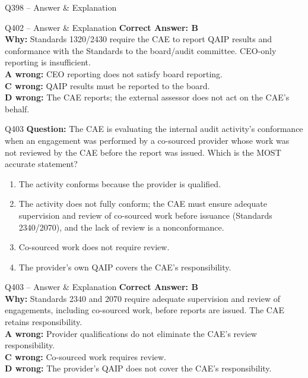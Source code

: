 \documentclass[aspectratio=169,10pt]{beamer}
\begin{document}
\begin{frame}[t]{Q398 -- Answer \& Explanation}
	\begin{frame}[t]{Q402 -- Answer \& Explanation}
		\small
		\textbf{Correct Answer: B} \\[4pt]
		\textbf{Why:} Standards 1320/2430 require the CAE to report QAIP results and conformance with the Standards to the board/audit committee. CEO-only reporting is insufficient. \\[4pt]
		\textbf{A wrong:} CEO reporting does not satisfy board reporting. \\[2pt]
		\textbf{C wrong:} QAIP results must be reported to the board. \\[2pt]
		\textbf{D wrong:} The CAE reports; the external assessor does not act on the CAE's behalf.
	\end{frame}
	
	\begin{frame}[t]{Q403}
		\small
		\textbf{Question:} The CAE is evaluating the internal audit activity's conformance when an engagement was performed by a co-sourced provider whose work was not reviewed by the CAE before the report was issued. Which is the MOST accurate statement?
		\begin{enumerate}[label=\Alph*.,itemsep=1pt,topsep=2pt]
			\item The activity conforms because the provider is qualified.
			\item The activity does not fully conform; the CAE must ensure adequate supervision and review of co-sourced work before issuance (Standards 2340/2070), and the lack of review is a nonconformance.
			\item Co-sourced work does not require review.
			\item The provider's own QAIP covers the CAE's responsibility.
		\end{enumerate}
	\end{frame}
	
	\begin{frame}[t]{Q403 -- Answer \& Explanation}
		\small
		\textbf{Correct Answer: B} \\[4pt]
		\textbf{Why:} Standards 2340 and 2070 require adequate supervision and review of engagements, including co-sourced work, before reports are issued. The CAE retains responsibility. \\[4pt]
		\textbf{A wrong:} Provider qualifications do not eliminate the CAE's review responsibility. \\[2pt]
		\textbf{C wrong:} Co-sourced work requires review. \\[2pt]
		\textbf{D wrong:} The provider's QAIP does not cover the CAE's responsibility.
	\end{frame}
	

\end{frame}
\end{document}
